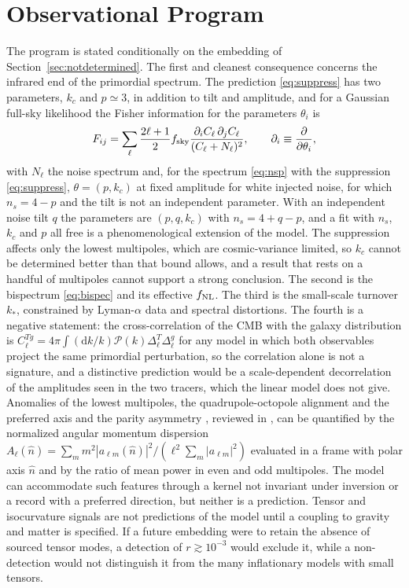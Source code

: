 \documentclass[11pt]{article}
\theoremstyle{definition}
\theoremstyle{remark}
\newcommand{\dd}{\mathrm{d}}
\newcommand{\Pk}{\mathcal{P}}
\begin{document}
\section{Observational Program}

The program is stated conditionally on the embedding of Section~\ref{sec:notdetermined}. The first and cleanest consequence concerns the infrared end of the primordial spectrum. The prediction \eqref{eq:suppress} has two parameters, $k_c$ and $p\simeq3$, in addition to tilt and amplitude, and for a Gaussian full-sky likelihood the Fisher information for the parameters $\theta_i$ is
\begin{equation}
F_{ij}=\sum_\ell\frac{2\ell+1}2f_{\rm sky}\frac{\partial_iC_\ell\,\partial_jC_\ell}{(C_\ell+N_\ell)^2},\qquad\partial_i\equiv\frac\partial{\partial\theta_i},
\end{equation}
with $N_\ell$ the noise spectrum and, for the spectrum \eqref{eq:nsp} with the suppression \eqref{eq:suppress}, $\theta=(p,k_c)$ at fixed amplitude for white injected noise, for which $n_s=4-p$ and the tilt is not an independent parameter. With an independent noise tilt $q$ the parameters are $(p,q,k_c)$ with $n_s=4+q-p$, and a fit with $n_s$, $k_c$ and $p$ all free is a phenomenological extension of the model. The suppression affects only the lowest multipoles, which are cosmic-variance limited, so $k_c$ cannot be determined better than that bound allows, and a result that rests on a handful of multipoles cannot support a strong conclusion. The second is the bispectrum \eqref{eq:bispec} and its effective $f_{\rm NL}$. The third is the small-scale turnover $k_*$, constrained by Lyman-$\alpha$ data and spectral distortions. The fourth is a negative statement: the cross-correlation of the CMB with the galaxy distribution is $C_\ell^{Tg}=4\pi\int(\dd k/k)\Pk(k)\Delta_\ell^T\Delta_\ell^g$ for any model in which both observables project the same primordial perturbation, so the correlation alone is not a signature, and a distinctive prediction would be a scale-dependent decorrelation of the amplitudes seen in the two tracers, which the linear model does not give. Anomalies of the lowest multipoles, the quadrupole-octopole alignment and the preferred axis \cite{deoliveira2004,land2005} and the parity asymmetry \cite{kim2010}, reviewed in \cite{schwarz2016}, can be quantified by the normalized angular momentum dispersion $A_\ell(\hat n)=\sum_mm^2|a_{\ell m}(\hat n)|^2/(\ell^2\sum_m|a_{\ell m}|^2)$ evaluated in a frame with polar axis $\hat n$ and by the ratio of mean power in even and odd multipoles. The model can accommodate such features through a kernel not invariant under inversion or a record with a preferred direction, but neither is a prediction. Tensor and isocurvature signals are not predictions of the model until a coupling to gravity and matter is specified. If a future embedding were to retain the absence of sourced tensor modes, a detection of $r\gtrsim10^{-3}$ \cite{litebird2019} would exclude it, while a non-detection would not distinguish it from the many inflationary models with small tensors.
\end{document}

